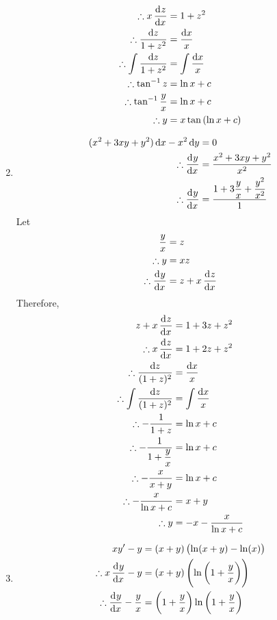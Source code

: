 \documentclass[fleqn, a4paper, 12pt, oneside]{amsart}
\theoremstyle{definition}
\theoremstyle{theorem}
\begin{document}
\begin{solution}
\begin{enumerate}[leftmargin=*]
\begin{align*}
				\therefore x \dod{z}{x} &= 1 + z^2\\
				\therefore \dfrac{\dif z}{1 + z^2} &= \dfrac{\dif x}{x}\\
				\therefore \int \dfrac{\dif z}{1 + z^2} &= \int \dfrac{\dif x}{x}\\
				\therefore \tan^{-1} z &= \ln x + c\\
				\therefore \tan^{-1} \dfrac{y}{x} &= \ln x + c\\
				\therefore y &= x \tan \left( \ln x + c \right)
			\end{align*}
		\item
			\begin{align*}
				(x^2 + 3xy + y^2) \dif x - x^2 \dif y &= 0\\
				\therefore \dod{y}{x} &= \dfrac{x^2 + 3xy + y^2}{x^2}\\
				\therefore \dod{y}{x} &= \dfrac{1 + 3 \dfrac{y}{x} + \dfrac{y^2}{x^2}}{1}
			\end{align*}
			Let
			\begin{align*}
				\dfrac{y}{x} &= z\\
				\therefore y &= x z\\
				\therefore \dod{y}{x} &= z + x \dod{z}{x}
			\end{align*}
			Therefore,
			\begin{align*}
				z + x \dod{z}{x} &= 1 + 3z + z^2\\
				\therefore x \dod{z}{x} &= 1 + 2z + z^2\\
				\therefore \dfrac{\dif z}{(1 + z)^2} &= \dfrac{\dif x}{x}\\
				\therefore \int \dfrac{\dif z}{(1 + z)^2} &= \int \dfrac{\dif x}{x}\\
				\therefore -\dfrac{1}{1 + z} &= \ln x + c\\
				\therefore -\dfrac{1}{1 + \dfrac{y}{x}} &= \ln x + c\\
				\therefore -\dfrac{x}{x + y} &= \ln x + c\\
				\therefore -\dfrac{x}{\ln x + c} &= x + y\\
				\therefore y &= -x - \dfrac{x}{\ln x + c}
			\end{align*}
		\item
			\begin{align*}
				x y' - y &= (x + y)\left( \ln (x + y)  - \ln (x) \right)\\
				\therefore x \dod{y}{x} - y &= (x + y) \left( \ln \left( 1 + \dfrac{y}{x} \right) \right)\\
				\therefore \dod{y}{x} - \dfrac{y}{x} &= \left( 1 + \dfrac{y}{x} \right) \ln \left( 1 + \dfrac{y}{x} \right)

\end{align*}
\end{enumerate}
\end{solution}
\end{document}
